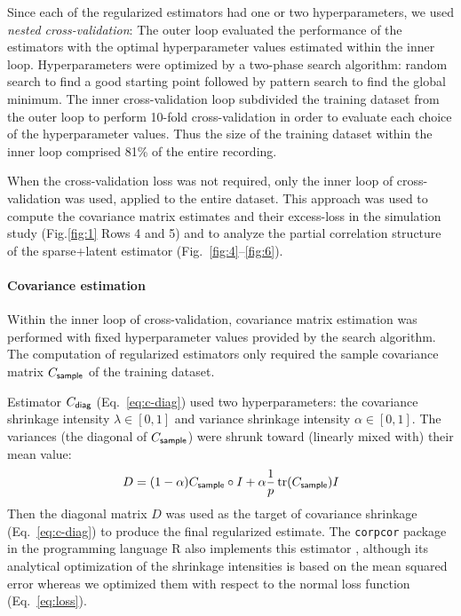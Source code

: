 \documentclass[10pt]{article}
\DeclareMathOperator{\Tr}{tr}
\newcommand{\figref}[2]{Fig.\;\ref{fig:#1}\,#2}
\begin{document}
Since each of the regularized estimators had one or two hyperparameters, we used \emph{nested cross-validation}:  The outer loop evaluated the performance of the estimators with the optimal hyperparameter values estimated within the inner loop.  Hyperparameters were optimized by a two-phase search algorithm: random search to find a good starting point followed by pattern search to find the global minimum.  The inner cross-validation loop subdivided the training dataset from the outer loop to perform 10-fold cross-validation in order to evaluate each choice of the hyperparameter values.  Thus the size of the training dataset within the inner loop comprised 81\% of the entire recording.

When the cross-validation loss was not required, only the inner loop of cross-validation was used, applied to the entire dataset.  This approach was used to compute the covariance matrix estimates and their excess-loss in the simulation study (\figref{1}{\,Rows 4 and 5}) and to analyze the partial correlation structure of the sparse+latent estimator (Fig.~\ref{fig:4}--\ref{fig:6}).
\paragraph{Covariance estimation}
Within the inner loop of cross-validation, covariance matrix estimation was performed with fixed hyperparameter values provided by the search algorithm.  The computation of regularized estimators only required the sample covariance matrix $C_{\sf sample}$ of the training dataset. 

Estimator $C_{\sf diag}$ (Eq.~\ref{eq:c-diag})  used two hyperparameters: the covariance shrinkage intensity $\lambda \in [0,1]$ and variance shrinkage intensity $\alpha \in [0,1]$.  The variances (the diagonal of $C_{\sf sample}$) were shrunk toward (linearly mixed with) their mean value:
\begin{equation}
D = (1-\alpha)C_{\sf sample}\circ I + \alpha \frac 1 p \Tr(C_{\sf sample}) I
\end{equation}
Then the diagonal matrix $D$ was used as the target of covariance shrinkage (Eq.~\ref{eq:c-diag}) to produce the final regularized estimate.  The {\tt corpcor} package in the programming language R also implements this estimator \cite{Schafer:2010}, although its analytical optimization of the shrinkage intensities is based on the mean squared error whereas we optimized them with respect to the normal loss function (Eq.~\ref{eq:loss}).
\end{document}
